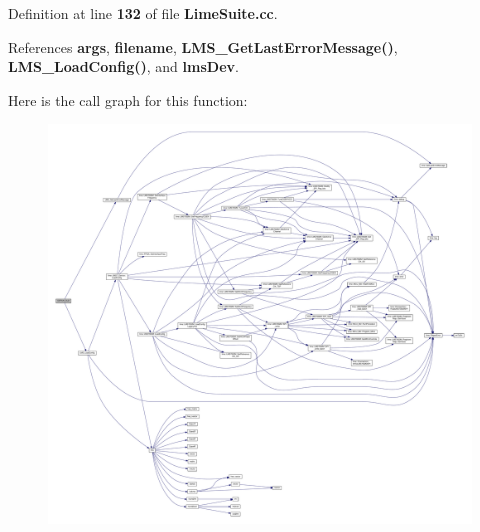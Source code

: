 Definition at line {\bf 132} of file {\bf Lime\+Suite.\+cc}.



References {\bf args}, {\bf filename}, {\bf L\+M\+S\+\_\+\+Get\+Last\+Error\+Message()}, {\bf L\+M\+S\+\_\+\+Load\+Config()}, and {\bf lms\+Dev}.



Here is the call graph for this function\+:
\nopagebreak
\begin{figure}[H]
\begin{center}
\leavevmode
\includegraphics[width=350pt]{db/d92/LimeSuite_8cc_a81ec1d0ca6ee2dcd6041916a53abc49d_cgraph}
\end{center}
\end{figure}


